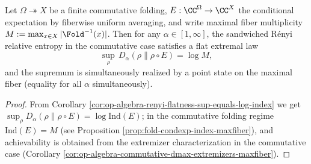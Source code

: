 \begin{conclusion}\label{con:xi-terminal-renyi-flatness-logM}
Let \(\Omega\twoheadrightarrow X\) be a finite commutative folding, \(E:\CC^\Omega\to \CC^X\) the conditional expectation by fiberwise uniform averaging,
and write maximal fiber multiplicity \(M:=\max_{x\in X}|\Fold^{-1}(x)|\).
Then for any \(\alpha\in[1,\infty]\), the sandwiched Rényi relative entropy in the commutative case satisfies a flat extremal law
\[
\sup_{\rho}\,D_\alpha(\rho\|\rho\circ E)=\log M,
\]
and the supremum is simultaneously realized by a point state on the maximal fiber (equality for all \(\alpha\) simultaneously).
\end{conclusion}
\begin{proof}[Proof]
From Corollary \ref{cor:op-algebra-renyi-flatness-sup-equals-log-index} we get \(\sup_\rho D_\alpha(\rho\|\rho\circ E)=\log\mathrm{Ind}(E)\);
in the commutative folding regime \(\mathrm{Ind}(E)=M\) (see Proposition \ref{prop:fold-condexp-index-maxfiber}), and achievability is obtained from the extremizer characterization in the commutative case (Corollary \ref{cor:op-algebra-commutative-dmax-extremizers-maxfiber}).
\end{proof}

